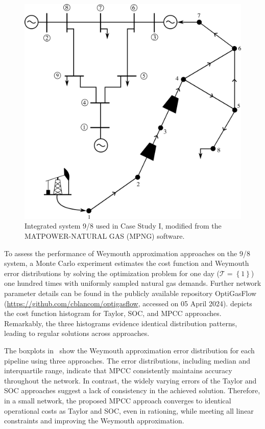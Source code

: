 \begin{figure}[H]
    \centering
    \includegraphics[scale=0.7]{figures/Chapter_MPCC/8 node 9 bus network.png}
    \caption{Integrated system 9/8 used in Case Study I, modified from the MATPOWER-NATURAL GAS (MPNG) software.}
    \label{fig:8-9 network}
\end{figure}

To assess the performance of Weymouth approximation approaches on the 9/8 system, a Monte Carlo experiment estimates the cost function and Weymouth error distributions by solving the optimization problem for one day ($\mathcal{T}=\left\lbrace 1\right\rbrace$) one hundred times with uniformly sampled natural gas demands. Further network parameter details can be found in the publicly available repository OptiGasFlow ({\url{https://github.com/cblancom/optigasflow}}, accessed on 05 April 2024). 
  depicts the cost function histogram for Taylor, SOC, and MPCC approaches. Remarkably, the three histograms evidence identical distribution patterns, leading to regular solutions across approaches.

The boxplots in~ show the Weymouth approximation error distribution for each pipeline using three approaches. The error distributions, including median and interquartile range, indicate that MPCC consistently maintains accuracy throughout the network. In contrast, the widely varying errors of the Taylor and SOC approaches suggest a lack of consistency in the achieved solution. Therefore, in a small network, the proposed MPCC approach converges to identical operational costs as Taylor and SOC, even in rationing, while meeting all linear constraints and improving the Weymouth approximation.


